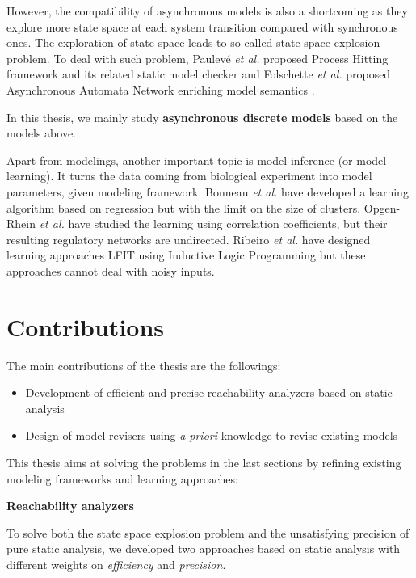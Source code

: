 However, the compatibility of asynchronous models is also a shortcoming as they explore more state space at each system transition compared with synchronous ones.
The exploration of state space leads to so-called state space explosion problem.
To deal with such problem, Paulev\'e \textit{et al.} proposed Process Hitting framework and its related static model checker \cite{pauleve2012} and Folschette \textit{et al.} proposed Asynchronous Automata Network enriching model semantics \cite{folschette2015}.

In this thesis, we mainly study \textbf{asynchronous discrete models} based on the models above.

Apart from modelings, another important topic is model inference (or model learning).
It turns the data coming from biological experiment into model parameters, given modeling framework.
Bonneau \textit{et al.} \cite{bonneau2006inferelator} have developed a learning algorithm based on regression but with the limit on the size of clusters.
Opgen-Rhein \textit{et al.} \cite{opgen2007correlation} have studied the learning using correlation coefficients, but their resulting regulatory networks are undirected. 
Ribeiro \textit{et al.} have designed learning approaches LFIT using Inductive Logic Programming \cite{ribeiro2015learning,ribeiro2018learning,ribeiro2017inductive} but these approaches cannot deal with noisy inputs.

\section{Contributions}\label{sec:contribution}
The main contributions of the thesis are the followings:
\begin{itemize}
    \item Development of efficient and precise reachability analyzers based on static analysis
    \item Design of model revisers using \textit{a priori} knowledge to revise existing models
\end{itemize}

This thesis aims at solving the problems in the last sections by refining existing modeling frameworks and learning approaches:

\textbf{Reachability analyzers}

To solve both the state space explosion problem and the unsatisfying precision of pure static analysis, we developed two approaches based on static analysis with different weights on \textit{efficiency} and \textit{precision}.

